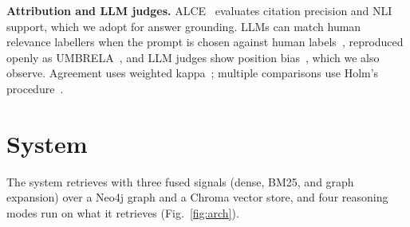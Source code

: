 \documentclass[conference]{IEEEtran}
\begin{document}
\textbf{Attribution and LLM judges.} ALCE~\cite{gao2023alce} evaluates citation precision and NLI support, which we adopt for answer grounding. LLMs can match human relevance labellers when the prompt is chosen against human labels~\cite{thomas2024llm}, reproduced openly as UMBRELA~\cite{upadhyay2024umbrela}, and LLM judges show position bias~\cite{zheng2023judging}, which we also observe. Agreement uses weighted kappa~\cite{cohen1968weighted}; multiple comparisons use Holm's procedure~\cite{holm1979simple}.

\section{System}
\label{sec:system}

The system retrieves with three fused signals (dense, BM25, and graph expansion) over a Neo4j graph and a Chroma vector store, and four reasoning modes run on what it retrieves (Fig.~\ref{fig:arch}).
\end{document}
